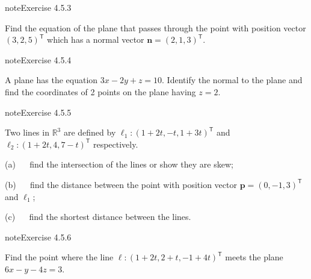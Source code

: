 \documentclass[letterpaper,10pt,english]{jupyterBook}
\begin{document}
\begin{sphinxadmonition}{note}{Exercise 4.5.3}



\sphinxAtStartPar
Find the equation of the plane that passes through the point with position vector \((3, 2, 5)^\mathsf{T}\) which has a normal vector \(\mathbf{n} = (2, 1, 3)^\mathsf{T}\).
\end{sphinxadmonition}
 \label{exercise:geometry-ex-plane-1}

\begin{sphinxadmonition}{note}{Exercise 4.5.4}



\sphinxAtStartPar
A plane has the equation \(3x - 2y + z = 10\). Identify the normal to the plane and find the co\sphinxhyphen{}ordinates of 2 points on the plane having \(z = 2\).
\end{sphinxadmonition}
 \label{exercise:geometry-ex-line-point-distance}

\begin{sphinxadmonition}{note}{Exercise 4.5.5}



\sphinxAtStartPar
Two lines in \(\mathbb{R}^3\) are defined by \(\ell_1: (1 + 2t, -t, 1 + 3t)^\mathsf{T}\) and \(\ell_2: (1 + 2t, 4, 7 - t)^\mathsf{T}\) respectively.

\sphinxAtStartPar
(a)   find the intersection of the lines or show they are skew;

\sphinxAtStartPar
(b)   find the distance between the point with position vector \(\mathbf{p} = (0, -1, 3)^\mathsf{T}\) and \(\ell_1\);

\sphinxAtStartPar
(c)   find the shortest distance between the lines.
\end{sphinxadmonition}
 \label{exercise:geometry-ex-line-plane-intersection}

\begin{sphinxadmonition}{note}{Exercise 4.5.6}



\sphinxAtStartPar
Find the point where the line \(\ell:(1 + 2t, 2 + t, -1 + 4t)^\mathsf{T}\) meets the plane \(6x - y - 4z = 3\).
\end{sphinxadmonition}
 \label{exercise:geometry-ex-point-plane-distance}
\end{document}
